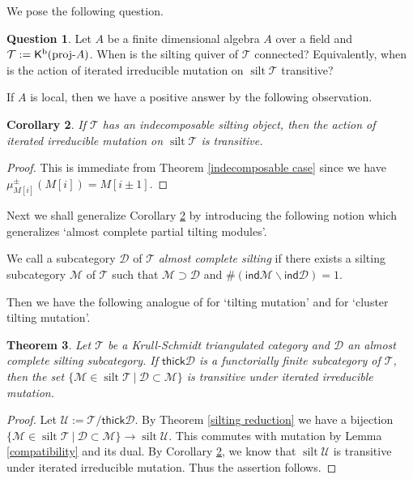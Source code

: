 \documentclass[a4paper,reqno]{amsart}
\newtheorem{theorem}{Theorem}[section]
\newtheorem{corollary}[theorem]{Corollary}
\theoremstyle{definition}
\newtheorem{question}[theorem]{Question}
\newcommand{\DD}{{\mathcal D}}
\newcommand{\UU}{{\mathcal U}}
\newcommand{\TT}{{\mathcal T}}
\newcommand{\MM}{{\mathcal M}}
\newcommand{\ind}{\mathsf{ind}}
\newcommand{\thick}{\mathsf{thick}}
\newcommand{\silt}{\operatorname{silt}\nolimits}
\newcommand{\proj}[1]{{\rm{proj}}\text{-}#1} %
\newcommand{\K}{\mathsf{K}}
\begin{document}
We pose the following question.

\begin{question}\label{transitive question2}
Let $A$ be a finite dimensional algebra $A$ over a field and $\TT:=\K^{\rm b}(\proj A)$.
When is the silting quiver of $\TT$ connected?
Equivalently, when is the action of iterated irreducible mutation on $\silt\TT$ transitive?
\end{question}

If $A$ is local, then we have a positive answer by the following observation.

\begin{corollary}\label{corollary indecomposable case}
If $\TT$ has an indecomposable silting object, 
then the action of iterated irreducible mutation on $\silt\TT$ is transitive.
\end{corollary}

\begin{proof}
This is immediate from Theorem \ref{indecomposable case}
since we have $\mu_{M[i]}^{\pm}(M[i])=M[i\pm1]$.
\end{proof}

Next we shall generalize Corollary \ref{corollary indecomposable case} by
introducing the following notion which generalizes `almost complete partial tilting modules'.

We call a subcategory $\DD$ of $\TT$ \emph{almost complete silting} if there exists a
silting subcategory $\MM$ of $\TT$ such that $\MM\supset\DD$ and $\#(\ind\MM\backslash\ind\DD)=1$.

Then we have the following analogue of \cite[2.1]{HU} for `tilting mutation'
and \cite[5.3]{IY} for `cluster tilting mutation'.

\begin{theorem}\label{almost transitivity}
Let $\TT$ be a Krull-Schmidt triangulated category and $\DD$ an almost complete silting subcategory.
If $\thick\DD$ is a functorially finite subcategory of $\TT$, then the set $\{\MM\in\silt\TT\ |\ \DD\subset\MM\}$ is transitive under iterated irreducible mutation.
\end{theorem}

\begin{proof}
Let $\UU:=\TT/\thick\DD$.
By Theorem \ref{silting reduction} we have a bijection
$\{\MM\in\silt\TT\ |\ \DD\subset\MM\}\to\silt\UU$.
This commutes with mutation by Lemma \ref{compatibility} and its dual.
By Corollary \ref{corollary indecomposable case}, we know that $\silt\UU$ is transitive under iterated irreducible mutation.
Thus the assertion follows.
\end{proof}
\end{document}
